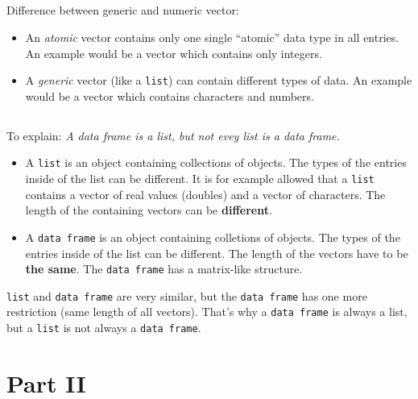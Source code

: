 \documentclass{article}
\begin{document}
\subsection{}

Difference between generic and numeric vector:

\begin{itemize}
\item An \emph{atomic} vector contains only one single ``atomic'' data type in all entries. An example would be a vector which contains only integers.
\item A \emph{generic} vector (like a \texttt{list}) can contain different types of data. An example would be a vector which contains characters and numbers.
\end{itemize}

\subsection{}

To explain: \emph{A data frame is a list, but not evey list is a data frame.}

\begin{itemize}
\item A \texttt{list} is an object containing collections of objects. The types of the entries inside of the list can be different. It is for example allowed that a \texttt{list} contains a vector of real values (doubles) and a vector of characters. The length of the containing vectors can be \textbf{different}.
\item A \texttt{data frame} is an object containing colletions of objects. The types of the entries inside of the list can be different. The length of the vectors have to be \textbf{the same}. The \texttt{data frame} has a matrix-like structure.
\end{itemize}

\texttt{list} and \texttt{data frame} are very similar, but the \texttt{data frame} has one more restriction (same length of all vectors). That's why a \texttt{data frame} is always a list, but a \texttt{list} is not always a \texttt{data frame}.

\section{Part II}
\end{document}
